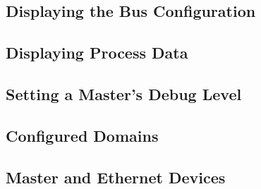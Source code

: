 \documentclass[a4paper,12pt,BCOR6mm,bibtotoc,idxtotoc]{scrbook}
\begin{document}



\subsection{Displaying the Bus Configuration}
\label{sec:ethercat-config}




\subsection{Displaying Process Data}




\subsection{Setting a Master's Debug Level}




\subsection{Configured Domains}




\subsection{Master and Ethernet Devices}



\end{document}
